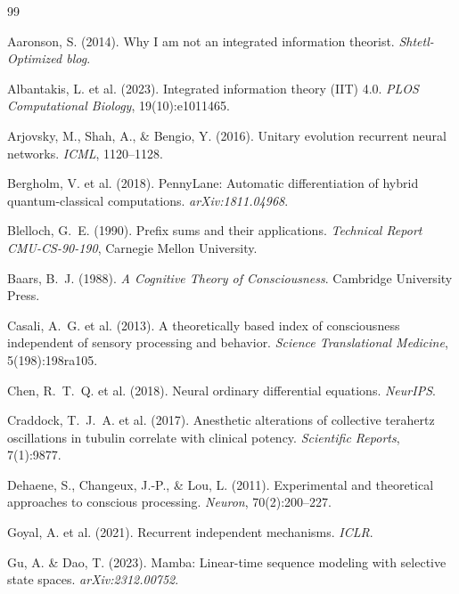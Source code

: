 \documentclass[11pt]{article}
\theoremstyle{definition}
\begin{document}

\begin{thebibliography}{99}

Aaronson, S. (2014). Why I am not an integrated information theorist. \textit{Shtetl-Optimized blog}.

Albantakis, L. et al. (2023). Integrated information theory (IIT) 4.0. \textit{PLOS Computational Biology}, 19(10):e1011465.

Arjovsky, M., Shah, A., \& Bengio, Y. (2016). Unitary evolution recurrent neural networks. \textit{ICML}, 1120--1128.

Bergholm, V. et al. (2018). PennyLane: Automatic differentiation of hybrid quantum-classical computations. \textit{arXiv:1811.04968}.

Blelloch, G.~E. (1990). Prefix sums and their applications. \textit{Technical Report CMU-CS-90-190}, Carnegie Mellon University.

Baars, B.~J. (1988). \textit{A Cognitive Theory of Consciousness}. Cambridge University Press.

Casali, A.~G. et al. (2013). A theoretically based index of consciousness independent of sensory processing and behavior. \textit{Science Translational Medicine}, 5(198):198ra105.

Chen, R.~T.~Q. et al. (2018). Neural ordinary differential equations. \textit{NeurIPS}.

Craddock, T.~J.~A. et al. (2017). Anesthetic alterations of collective terahertz oscillations in tubulin correlate with clinical potency. \textit{Scientific Reports}, 7(1):9877.

Dehaene, S., Changeux, J.-P., \& Lou, L. (2011). Experimental and theoretical approaches to conscious processing. \textit{Neuron}, 70(2):200--227.

Goyal, A. et al. (2021). Recurrent independent mechanisms. \textit{ICLR}.

Gu, A. \& Dao, T. (2023). Mamba: Linear-time sequence modeling with selective state spaces. \textit{arXiv:2312.00752}.


\end{thebibliography}
\end{document}
